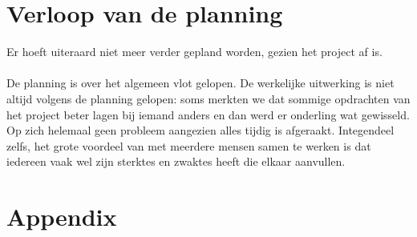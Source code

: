 \documentclass[11pt, a4paper]{article}
\begin{document}
\section{Verloop van de planning}
Er hoeft uiteraard niet meer verder gepland worden, gezien het project af is.
\\
\\
De planning is over het algemeen vlot gelopen. De werkelijke uitwerking is niet altijd volgens de planning gelopen: soms merkten we dat sommige opdrachten van het project beter lagen bij iemand anders en dan werd er onderling wat gewisseld.
Op zich helemaal geen probleem aangezien alles tijdig is afgeraakt. Integendeel zelfs, het grote voordeel van met meerdere mensen samen te werken is dat iedereen vaak wel zijn sterktes en zwaktes heeft
die elkaar aanvullen.


\section{Appendix}
\end{document}
